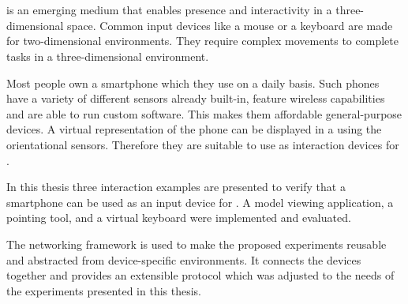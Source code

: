 \chapter{\abstractname}

 is an emerging medium that enables presence and interactivity in a three-dimensional space. Common input devices like a mouse or a keyboard are made for two-dimensional environments. They require complex movements to complete tasks in a three-dimensional environment.%

Most people own a smartphone which they use on a daily basis. Such phones have a variety of different sensors already built-in, feature wireless capabilities and are able to run custom software. This makes them affordable general-purpose devices. A virtual representation of the phone can be displayed in a  using the orientational sensors. Therefore they are suitable to use as interaction devices for .

In this thesis three interaction examples are presented to verify that a smartphone can be used as an input device for . A model viewing application, a pointing tool, and a virtual keyboard were implemented and evaluated. 

The  networking framework is used to make the proposed experiments reusable and abstracted from device-specific environments. It connects the devices together and provides an extensible protocol which was adjusted to the needs of the experiments presented in this thesis.